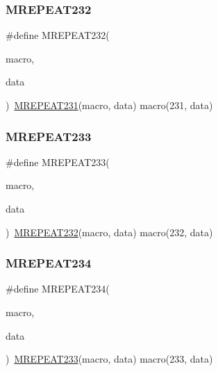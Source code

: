 \mbox{\label{group__group__sam0__utils__mrepeat_ga7adad754d082734bb39548d811081bc3}} 
\subsubsection{\texorpdfstring{MREPEAT232}{MREPEAT232}}
{\footnotesize\ttfamily \#define M\+R\+E\+P\+E\+A\+T232(\begin{DoxyParamCaption}\item[{}]{macro,  }\item[{}]{data }\end{DoxyParamCaption})~\mbox{\hyperlink{group__group__sam0__utils__mrepeat_ga3f6882a8daac99c9571e37fd306c5451}{M\+R\+E\+P\+E\+A\+T231}}(macro, data)   macro(231, data)}

\mbox{\label{group__group__sam0__utils__mrepeat_ga859709294d903b0f32c05695158fe8a6}} 
\subsubsection{\texorpdfstring{MREPEAT233}{MREPEAT233}}
{\footnotesize\ttfamily \#define M\+R\+E\+P\+E\+A\+T233(\begin{DoxyParamCaption}\item[{}]{macro,  }\item[{}]{data }\end{DoxyParamCaption})~\mbox{\hyperlink{group__group__sam0__utils__mrepeat_ga7adad754d082734bb39548d811081bc3}{M\+R\+E\+P\+E\+A\+T232}}(macro, data)   macro(232, data)}

\mbox{\label{group__group__sam0__utils__mrepeat_gadff2111488b4bd5fc5d6407ec9dccefd}} 
\subsubsection{\texorpdfstring{MREPEAT234}{MREPEAT234}}
{\footnotesize\ttfamily \#define M\+R\+E\+P\+E\+A\+T234(\begin{DoxyParamCaption}\item[{}]{macro,  }\item[{}]{data }\end{DoxyParamCaption})~\mbox{\hyperlink{group__group__sam0__utils__mrepeat_ga859709294d903b0f32c05695158fe8a6}{M\+R\+E\+P\+E\+A\+T233}}(macro, data)   macro(233, data)}

